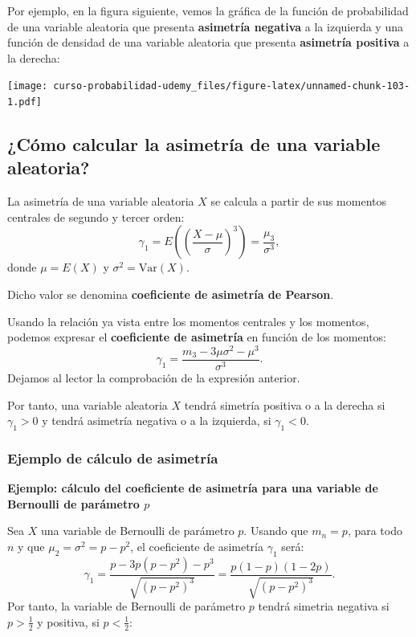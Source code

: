 \documentclass[]{book}
\begin{document}
Por ejemplo, en la figura siguiente, vemos la gráfica de la función de probabilidad de una variable aleatoria que presenta \textbf{asimetría negativa} a la izquierda y una función de densidad de una variable aleatoria que presenta \textbf{asimetría positiva} a la derecha:

\texttt{[image: curso-probabilidad-udemy\_files/figure-latex/unnamed-chunk-103-1.pdf]}

\hypertarget{cuxf3mo-calcular-la-asimetruxeda-de-una-variable-aleatoria}{%
\subsection{¿Cómo calcular la asimetría de una variable aleatoria?}\label{cuxf3mo-calcular-la-asimetruxeda-de-una-variable-aleatoria}}

La asimetría de una variable aleatoria \(X\) se calcula a partir de sus momentos centrales de segundo y tercer orden:
\[
\gamma_1 = E\left({\left(\frac{X-\mu}{\sigma}\right)}^3\right)=\frac{\mu_3}{\sigma^3},
\]
donde \(\mu = E(X)\) y \(\sigma^2 =\mathrm{Var}(X)\).

Dicho valor se denomina \textbf{coeficiente de asimetría de Pearson}.

Usando la relación ya vista entre los momentos centrales y los momentos, podemos expresar el \textbf{coeficiente de asimetría} en función de los momentos:
\[
\gamma_1 = \frac{m_3 -3\mu\sigma^2-\mu^3}{\sigma^3}.
\]
Dejamos al lector la comprobación de la expresión anterior.

Por tanto, una variable aleatoria \(X\) tendrá simetría positiva o a la derecha si \(\gamma_1 >0\) y tendrá asimetría negativa o a la izquierda, si \(\gamma_1 <0\).

\hypertarget{ejemplo-de-cuxe1lculo-de-asimetruxeda}{%
\subsubsection{Ejemplo de cálculo de asimetría}\label{ejemplo-de-cuxe1lculo-de-asimetruxeda}}

\textbf{Ejemplo: cálculo del coeficiente de asimetría para una variable de Bernoulli de parámetro \(p\)}

Sea \(X\) una variable de Bernoulli de parámetro \(p\). Usando que \(m_n =p\), para todo \(n\) y que \(\mu_2 = \sigma^2 = p-p^2\), el coeficiente de asimetría \(\gamma_1\) será:
\[
\gamma_1 = \frac{p-3p(p-p^2)-p^3}{\sqrt{(p-p^2)^3}} = \frac{p (1-p) (1-2p)}{{\sqrt{(p-p^2)^3}}}.
\]
Por tanto, la variable de Bernoulli de parámetro \(p\) tendrá simetria negativa si \(p>\frac{1}{2}\) y positiva, si \(p<\frac{1}{2}\):
\end{document}
